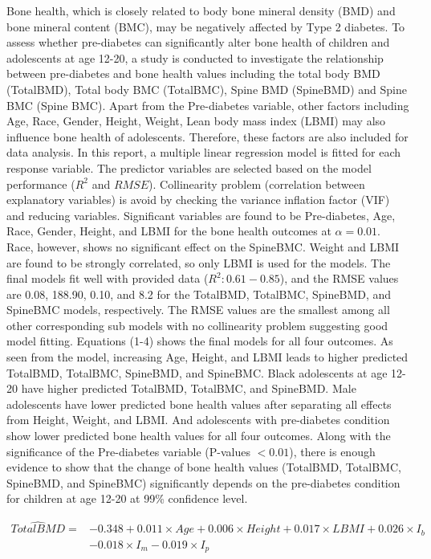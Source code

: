 \documentclass[11pt]{article}
\begin{document}
Bone health, which is closely related to body bone mineral density (BMD) and bone mineral content (BMC), may be negatively affected by Type 2 diabetes. To assess whether pre-diabetes can significantly alter bone health of children and adolescents at age 12-20, a study is conducted to investigate the relationship between pre-diabetes and bone health values including the total body BMD (TotalBMD), Total body BMC (TotalBMC), Spine BMD (SpineBMD) and Spine BMC (Spine BMC). Apart from the Pre-diabetes variable, other factors including Age, Race, Gender, Height, Weight, Lean body mass index (LBMI) may also influence bone health of adolescents. Therefore, these factors are also included for data analysis. In this report, a multiple linear regression model is fitted for each response variable. The predictor variables are selected based on the model performance ($R^2$ and $RMSE$). Collinearity problem (correlation between explanatory variables) is avoid by checking the variance inflation factor (VIF) and reducing variables. Significant variables are found to be Pre-diabetes, Age, Race, Gender, Height, and LBMI for the bone health outcomes at $\alpha=0.01$. Race, however, shows no significant effect on the SpineBMC. Weight and LBMI are found to be strongly correlated, so only LBMI is used for the models. The final models fit well with provided data ($R^2: 0.61-0.85$), and the RMSE values are 0.08, 188.90, 0.10, and 8.2 for the TotalBMD, TotalBMC, SpineBMD, and SpineBMC models, respectively. The RMSE values are the smallest among all other corresponding sub models with no collinearity problem suggesting good model fitting. Equations (1-4) shows the final models for all four outcomes. As seen from the model, increasing Age, Height, and LBMI leads to higher predicted TotalBMD, TotalBMC, SpineBMD, and SpineBMC. Black adolescents at age 12-20 have higher predicted TotalBMD, TotalBMC, and SpineBMD. Male adolescents have lower predicted bone health values after separating all effects from Height, Weight, and LBMI. And adolescents with pre-diabetes condition show lower predicted bone health values for all four outcomes. Along with the significance of the Pre-diabetes variable (P-values $<0.01$), there is enough evidence to show that the change of bone health values (TotalBMD, TotalBMC, SpineBMD, and SpineBMC) significantly depends on the pre-diabetes condition for children at age 12-20 at 99\% confidence level. 


\begin{equation}
\begin{split}
\hat{TotalBMD} = &-0.348 +0.011\times Age +0.006\times Height +0.017\times LBMI + 0.026\times I_b\\
&  -0.018\times I_m -0.019\times I_p \\
\end{split}
\end{equation}
\end{document}
